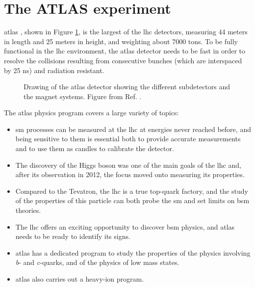 


\section{The ATLAS experiment}
\label{sed:cern:atlas}

\gls{atlas} \cite{atlas:atlas}, shown in Figure \ref{fig:atlas:atlas}, is the largest of the \gls{lhc} detectors, 
measuring 44 meters in length and 25 meters in height, and weighting about 7000 tons. 
To be fully functional in the \gls{lhc} environment,  the \gls{atlas} detector needs to be fast in order to resolve the collisions resulting from consecutive bunches (which are interspaced by 25 ns) and radiation resistant. 

\begin{figure}[ht]
\centering
{}
\caption{Drawing of the \gls{atlas} detector showing the different subdetectors and
the magnet systems. Figure from Ref. \cite{atlas:atlas}.}
\label{fig:atlas:atlas}
\end{figure}

The \gls{atlas} physics program covers a large variety of topics: 
\begin{itemize}
\item \gls{sm} processes can be measured at the \gls{lhc} at energies never reached before, and being sensitive to them is essential both to provide accurate measurements and to use them as candles to calibrate the detector. 
\item The discovery of the Higgs boson was one of the main goals of the \gls{lhc} and, after its observation in 2012, the focus moved onto measuring its properties. 
\item Compared to the Tevatron, the \gls{lhc} is a true top-quark factory, 
and the study of the properties of this particle can both probe the \gls{sm} and set limits on \gls{bsm} theories.
\item The \gls{lhc} offers an exciting opportunity to discover \gls{bsm} physics, and \gls{atlas} needs to be ready to identify its signs. 
\item \gls{atlas} has a dedicated program to study the properties of the physics involving \textit{b}- and \textit{c}-quarks, and of the physics of low mass states.  
\item \gls{atlas} also carries out a heavy-ion program.
\end{itemize}

